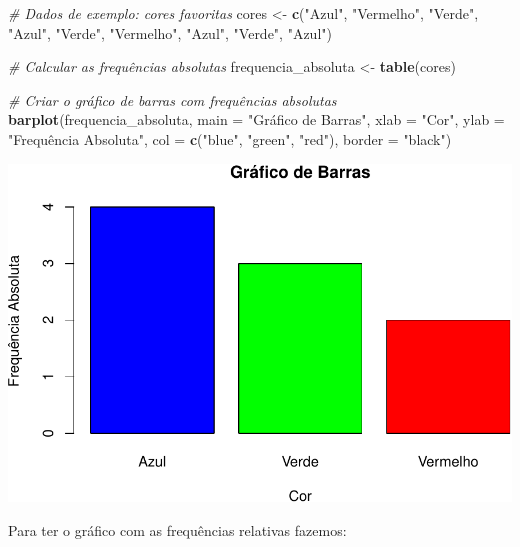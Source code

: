 \documentclass[
]{book}
\newenvironment{Shaded}{\begin{snugshade}}{\end{snugshade}}
\newcommand{\AttributeTok}[1]{\textcolor[rgb]{0.13,0.29,0.53}{#1}}
\newcommand{\CommentTok}[1]{\textcolor[rgb]{0.56,0.35,0.01}{\textit{#1}}}
\newcommand{\FunctionTok}[1]{\textcolor[rgb]{0.13,0.29,0.53}{\textbf{#1}}}
\newcommand{\NormalTok}[1]{#1}
\newcommand{\OtherTok}[1]{\textcolor[rgb]{0.56,0.35,0.01}{#1}}
\newcommand{\StringTok}[1]{\textcolor[rgb]{0.31,0.60,0.02}{#1}}
\begin{document}
\begin{Shaded}
\begin{Highlighting}[]
\CommentTok{\# Dados de exemplo: cores favoritas}
\NormalTok{cores }\OtherTok{\textless{}{-}} \FunctionTok{c}\NormalTok{(}\StringTok{"Azul"}\NormalTok{, }\StringTok{"Vermelho"}\NormalTok{, }\StringTok{"Verde"}\NormalTok{, }\StringTok{"Azul"}\NormalTok{, }\StringTok{"Verde"}\NormalTok{, }
\StringTok{"Vermelho"}\NormalTok{, }\StringTok{"Azul"}\NormalTok{, }\StringTok{"Verde"}\NormalTok{, }\StringTok{"Azul"}\NormalTok{)}

\CommentTok{\# Calcular as frequências absolutas}
\NormalTok{frequencia\_absoluta }\OtherTok{\textless{}{-}} \FunctionTok{table}\NormalTok{(cores)}

\CommentTok{\# Criar o gráfico de barras com frequências absolutas}
\FunctionTok{barplot}\NormalTok{(frequencia\_absoluta,}
  \AttributeTok{main =} \StringTok{"Gráfico de Barras"}\NormalTok{,         }
  \AttributeTok{xlab =} \StringTok{"Cor"}\NormalTok{,         }
  \AttributeTok{ylab =} \StringTok{"Frequência Absoluta"}\NormalTok{,         }
  \AttributeTok{col =} \FunctionTok{c}\NormalTok{(}\StringTok{"blue"}\NormalTok{, }\StringTok{"green"}\NormalTok{, }\StringTok{"red"}\NormalTok{),}
  \AttributeTok{border =} \StringTok{"black"}\NormalTok{) }
\end{Highlighting}
\end{Shaded}

\includegraphics{introR_files/figure-latex/unnamed-chunk-162-1.pdf}

Para ter o gráfico com as frequências relativas fazemos:
\end{document}
